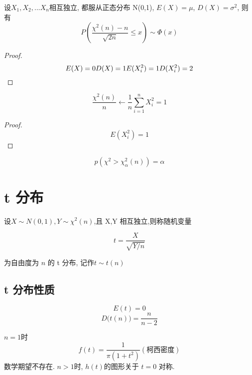 \begin{corollary}[卡方分布中心极限定理]
    设$X_1,X_2,...X_n$相互独立, 都服从正态分布 N(0,1), $E(X)=\mu$, $D(X)=\sigma^2$, 则有
    $$
        P(\frac{\chi^2(n)-n}{\sqrt{2n}} \le x) \sim \Phi(x)
    $$
\end{corollary}

\begin{proof}
    $$
        E(X) = 0\\
        D(X) = 1\\
        E(X_i^2) = 1\\
        D(X_i^2) = 2
    $$
\end{proof}

\begin{corollary}
    $$
        \frac{\chi^2(n)}{n} \leftarrow  \frac{1}{n} \sum^n_{i=1} X_i^2 = 1
    $$
\end{corollary}

\begin{proof}
    $$
        E(X_i^2) = 1
    $$
\end{proof}

\begin{definition}[卡方分布的上分位点]
    $$
        p(\chi^2 > \chi^2_\alpha(n)) = \alpha
    $$
\end{definition}

\section{t 分布}

\begin{definition}[自由度为 $t$ 的 t 分布]
    设$X \sim N(0,1), Y \sim \chi^2(n)$,且 X,Y 相互独立,则称随机变量

    $$
        t = \frac{X}{\sqrt{Y/n}}
    $$

    为自由度为 $n$ 的 t 分布, 记作$t \sim t(n)$

\end{definition}

\subsection{t 分布性质}

\begin{corollary}[t 分布数学期望和方差]
    $$
        E(t) = 0
    $$
    $$
        D\big(t(n)\big) = \frac{n}{n-2}
    $$
\end{corollary}

\begin{corollary}[t 分布的概率密度函数]
    $n = 1$时 $$f(t)=\frac{1}{\pi (1+t^2)}(柯西密度)$$ 数学期望不存在.
    $n>1$时, $h(t)$的图形关于 $t=0$ 对称.
\end{corollary}

